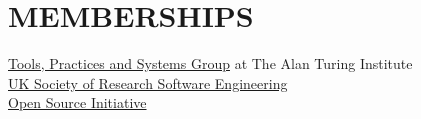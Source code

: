 \documentclass{cv}
\begin{document}
\section{MEMBERSHIPS}

\href{https://www.turing.ac.uk/research/research-programmes/tools-practices-and-systems}{Tools, Practices and Systems Group} at The Alan Turing Institute \\

\href{https://society-rse.org/}{UK Society of Research Software Engineering} \\

\href{http://opensource.org}{Open Source Initiative}

\end{document}
